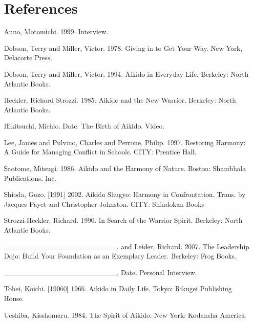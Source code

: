 \section*{References}

\begin{list}{}{}
\item Anno, Motomichi. 1999. Interview.
\item Dobson, Terry and Miller, Victor. 1978. Giving in to Get Your Way. New York, Delacorte Press.
\item Dobson, Terry and Miller, Victor. 1994. Aikido in Everyday Life. Berkeley: North Atlantic Books.
\item Heckler, Richard Strozzi. 1985. Aikido and the New Warrior. Berkeley: North Atlantic Books.
\item Hikitsuchi, Michio. Date. The Birth of Aikido. Video.
\item Lee, James and Pulvino, Charles and Perrone, Philip. 1997. Restoring Harmony: A Guide for Managing Conflict in Schools. CITY: Prentice Hall.
\item Saotome, Mitsugi. 1986. Aikido and the Harmony of Nature. Boston: Shambhala Publications, Inc.
\item Shioda, Gozo. [1991] 2002. Aikido Shugyo: Harmony in Confrontation. Trans. by Jacques Payet and Christopher Johnston. CITY: Shindokan Books
\item Strozzi-Heckler, Richard. 1990. In Search of the Warrior Spirit. Berkeley: North Atlantic Books.
\item \_\_\_\_\_\_\_\_\_\_\_\_\_\_\_\_\_\_\_\_\_\_. and Leider, Richard. 2007. The Leadership Dojo: Build Your Foundation as an Exemplary Leader. Berkeley: Frog Books.
\item \_\_\_\_\_\_\_\_\_\_\_\_\_\_\_\_\_\_\_\_\_\_. Date. Personal Interview.
\item Tohei, Koichi. [19060] 1966. Aikido in Daily Life. Tokyo: Rikugei Publishing House.
\item Ueshiba, Kisshomaru. 1984. The Spirit of Aikido. New York: Kodansha America.
\end{list}